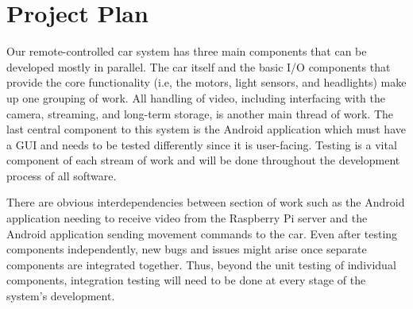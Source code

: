 \documentclass[letterpaper,12pt]{report}
\begin{document}
	\section*{Project Plan}
	\markright{}
	Our remote-controlled car system has three main components that can be
	developed mostly in parallel. The car itself and the basic I/O components
	that provide the core functionality (i.e, the motors, light sensors, and
	headlights) make up one grouping of work. All handling of video, including
	interfacing with the camera, streaming, and long-term storage, is another
	main thread of work. The last central component to this system is the
	Android application which must have a GUI and needs to be tested
	differently since it is user-facing. Testing is a vital component of each
	stream of work and will be done throughout the development process of all
	software.

	There are obvious interdependencies between section of work such as the
	Android application needing to receive video from the Raspberry Pi server
	and the Android application sending movement commands to the car. Even
	after testing components independently, new bugs and issues might arise
	once separate components are integrated together. Thus, beyond the unit
	testing of individual components, integration testing will need to be done
	at every stage of the system’s development.
\end{document}
